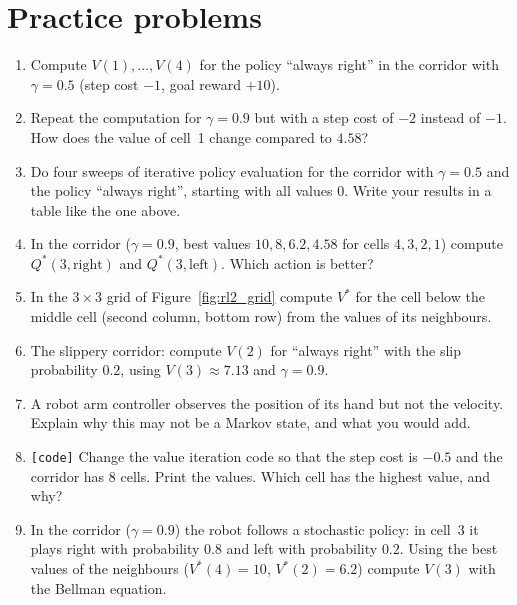 \section*{Practice problems}
\begin{enumerate}[label=\textbf{\thechapter.\arabic*}]
  \item Compute $V(1),\dots,V(4)$ for the policy ``always right'' in the corridor with $\gamma=0.5$ (step cost $-1$, goal reward $+10$).
  \item Repeat the computation for $\gamma=0.9$ but with a step cost of $-2$ instead of $-1$. How does the value of cell~1 change compared to $4.58$?
  \item Do four sweeps of iterative policy evaluation for the corridor with $\gamma=0.5$ and the policy ``always right'', starting with all values $0$. Write your results in a table like the one above.
  \item In the corridor ($\gamma=0.9$, best values $10,8,6.2,4.58$ for cells $4,3,2,1$) compute $Q^*(3,\text{right})$ and $Q^*(3,\text{left})$. Which action is better?
  \item In the $3\times3$ grid of Figure~\ref{fig:rl2_grid} compute $V^*$ for the cell below the middle cell (second column, bottom row) from the values of its neighbours.
  \item The slippery corridor: compute $V(2)$ for ``always right'' with the slip probability $0.2$, using $V(3)\approx7.13$ and $\gamma=0.9$.
  \item A robot arm controller observes the position of its hand but not the velocity. Explain why this may not be a Markov state, and what you would add.
  \item[\textbf{\thechapter.8}] \texttt{[code]} Change the value iteration code so that the step cost is $-0.5$ and the corridor has $8$ cells. Print the values. Which cell has the highest value, and why?
  \item[\textbf{\thechapter.9}$\star$] In the corridor ($\gamma=0.9$) the robot follows a stochastic policy: in cell~3 it plays right with probability $0.8$ and left with probability $0.2$. Using the best values of the neighbours ($V^*(4)=10$, $V^*(2)=6.2$) compute $V(3)$ with the Bellman equation.
\end{enumerate}
